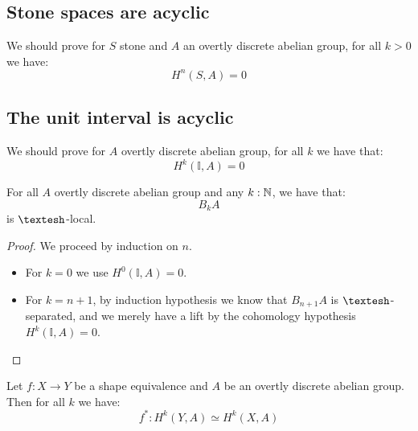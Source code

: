 \subsection{Stone spaces are acyclic}

We should prove for $S$ stone and $A$ an overtly discrete abelian group, for all $k>0$ we have:
\[H^n(S,A) = 0\]


\subsection{The unit interval is acyclic}

We should prove for $A$ overtly discrete abelian group, for all $k$ we have that:
\[H^k(\mathbb{I},A) = 0\]

\begin{lemma}\label{delooping-overtly-discrete-local}
For all $A$ overtly discrete abelian group and any $k:\mathbb{N}$, we have that:
\[B_kA\]
is $\shape$-local.
\end{lemma}

\begin{proof}
We proceed by induction on $n$. 
\begin{itemize}
\item For $k=0$ we use $H^0(\mathbb{I},A) = 0$.
\item For $k=n+1$, by induction hypothesis we know that $B_{n+1}A$ is $\shape$-separated, and we merely have a lift by the cohomology hypothesis $H^k(\mathbb{I},A) = 0$.
\end{itemize}
\end{proof}

\begin{corollary}
Let $f:X\to Y$ be a shape equivalence and $A$ be an overtly discrete abelian group. Then for all $k$ we have:
\[f^* : H^k(Y,A) \simeq H^k(X,A)\]
\end{corollary}